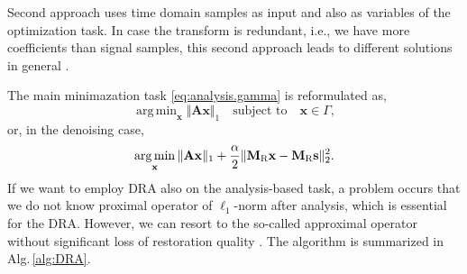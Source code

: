 \documentclass[conference]{IEEEtran}
\newcommand{\todo}[1]{\textcolor{red}{#1}}
\begin{document}
Second approach uses time domain samples as input and also as variables of the optimization task.
In case the transform is redundant, i.e., we have more coefficients than signal samples, this second approach leads to different solutions in general \cite{Mokry2020}. 

The main minimazation task \eqref{eq:analysis.gamma} is reformulated as,
\begin{equation}
	\label{eq:analysis.gamma}
	\mathop {\operatorname{arg \, min}}_\mathbf {x}\Vert \mathbf{A} \mathbf {x}\Vert _1 \quad \text{subject to}\quad \mathbf {x}\in \Gamma,
\end{equation}
or, in the denoising case,
\begin{equation}
	\label{eq:analysis.dist}
	\mathop {\operatorname{arg \, min}}_\mathbf {x}\Vert \mathbf{A} \mathbf {x}\Vert _1 + \frac{\alpha}{2} \Vert \mathbf{M}_{\textup{R}} \mathbf {x} - \mathbf{M}_{\textup{R}} \mathbf{s} \Vert^2_2.
\end{equation} 
If we want to employ DRA also on the analysis-based task, a problem occurs
that we do not know proximal operator of $ \ell_1 $-norm after analysis, which is essential for the DRA.
However, we can resort to the so-called approximal operator without significant loss of restoration quality \cite{Mokry2021}.
The algorithm is summarized in Alg.\,\ref{alg:DRA}.
\end{document}

